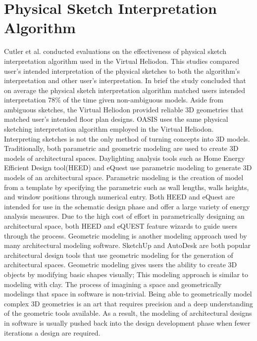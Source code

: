 \section{Physical Sketch Interpretation Algorithm}

	Cutler et al. conducted evaluations on the effectiveness of physical sketch interpretation algorithm used in the Virtual Heliodon\cite{cutler2009inferring}.
	This studies compared user's intended interpretation of the physical sketches to both the algorithm's interpretation and other user's interpretation.
	In brief the study concluded that on average the physical sketch interpretation algorithm matched users intended interpretation 78\% of the time given non-ambiguous models\cite{cutler2009inferring}.
	Aside from ambiguous sketches, the Virtual Heliodon provided reliable 3D geometries that matched user's intended floor plan designs.
	OASIS uses the same physical sketching interpretation algorithm employed in the Virtual Heliodon.\\

	Interpreting sketches is not the only method of turning concepts into 3D models.
	Traditionally, both parametric and geometric modeling are used to create 3D models of architectural spaces.
	Daylighting analysis tools such as Home Energy Efficient Design tool(HEED) and eQuest use parametric modeling to generate 3D models of an architectural space\cite{hirsch2010equest,milne2001drag}.
	Parametric modeling is the creation of model from a template by specifying the parametric such as wall lengths, walls heights, and window positions through numerical entry.
	Both HEED and eQuest are intended for use in the schematic design phase and offer a large variety of energy analysis measures.
	Due to the high cost of effort in parametrically designing an architectural space, both HEED and eQUEST feature wizards to guide users through the process. 
	Geometric modeling is another modeling approach used by many architectural modeling software.
	SketchUp and AutoDesk are both popular architectural design tools that use geometric modeling for the generation of architectural spaces. 
	Geometric modeling gives users the ability to create 3D objects by modifying basic shapes visually; This modeling approach is similar to modeling with clay.
	The process of imagining a space and geometrically modelings that space in software is non-trivial.
	Being able to geometrically model complex 3D geometries is an art that requires precision and a deep understanding of the geometric tools available.
	As a result, the modeling of architectural designs in software is usually pushed back into the design development phase when fewer iterations a design are required\cite{Galasiu}.\\

